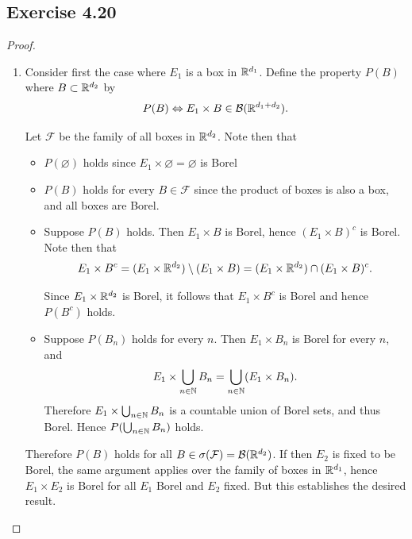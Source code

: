 \documentclass[hw_all.tex]{subfiles}
\begin{document}
\subsection{Exercise 4.20}

\begin{proof}
    \begin{enumerate}
        \item
            Consider first the case where $E_1$ is a box in $\mathbb{R}^{d_1}$. Define the property $P(B)$ where $B \subset \mathbb{R}^{d_2}$ by
            \[
                P(B) \Leftrightarrow E_1 \times B \in \mathcal{B}(\mathbb{R}^{d_1 + d_2})
            .\]
            
            Let $\mathcal{F}$ be the family of all boxes in $\mathbb{R}^{d_2}$. Note then that
            \begin{itemize}
                \item 
                    $P(\varnothing)$ holds since $E_1 \times \varnothing = \varnothing$ is Borel

                \item 
                    $P(B)$ holds for every $B \in \mathcal{F}$ since the product of boxes is also a box, and all boxes are Borel.

                \item 
                    Suppose $P(B)$ holds. Then $E_1 \times B$ is Borel, hence $(E_1 \times B)^c$ is Borel. Note then that
                    \[
                        E_1 \times B^c = (E_1 \times \mathbb{R}^{d_2}) \setminus (E_1 \times B) = (E_1 \times \mathbb{R}^{d_2}) \cap (E_1 \times B)^c
                    .\]

                    Since $E_1 \times \mathbb{R}^{d_2}$ is Borel, it follows that $E_1 \times B^c$ is Borel and hence $P(B^c)$ holds.

                \item 
                    Suppose $P(B_n)$ holds for every $n$. Then $E_1 \times B_n$ is Borel for every $n$, and
                    \[
                        E_1 \times \bigcup_{n \in \mathbb{N}} B_n = \bigcup_{n \in \mathbb{N}} (E_1 \times B_n)
                    .\]
                    Therefore $E_1 \times \bigcup_{n \in \mathbb{N}} B_n$ is a countable union of Borel sets, and thus Borel. Hence $P(\bigcup_{n \in \mathbb{N}} B_n)$ holds.
            \end{itemize}

            Therefore $P(B)$ holds for all $B \in \sigma(\mathcal{F}) = \mathcal{B}(\mathbb{R}^{d_2})$. If then $E_2$ is fixed to be Borel, the same argument applies over the family of boxes in $\mathbb{R}^{d_1}$, hence $E_1 \times E_2$ is Borel for all $E_1$ Borel and $E_2$ fixed. But this establishes the desired result.


\end{enumerate}
\end{proof}
\end{document}
